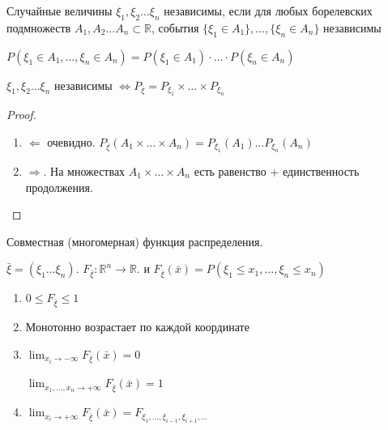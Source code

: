 \begin{definition}
    Случайные величины $\xi_1, \xi_2 \ldots \xi_n$ независимы, если для любых
    борелевских подмножеств $A_1, A_2 \ldots A_n \subset \mathbb{R}$, события
    $\{ \xi_1 \in A_1 \}, \ldots, \{ \xi_n \in A_n \}$ независимы

    \begin{remark}
        $P(\xi_1 \in A_1, \ldots, \xi_n \in A_n) = P(\xi_1 \in A_1) \cdot \ldots \cdot P(\xi_n \in A_n)$
    \end{remark}
\end{definition}

\begin{theorem}
    $\xi_1, \xi_2 \ldots \xi_n$ независимы $\Longleftrightarrow P_{\bar{\xi}} = P_{\xi_1} \times \ldots \times P_{\xi_n}$
\end{theorem}

\begin{proof}
    \begin{enumerate}
        \item $\Leftarrow$ очевидно. $P_{\bar{\xi}} (A_1 \times \ldots \times A_n) = P_{\xi_1} (A_1) \ldots P_{\xi_n}(A_n)$
        \item $\Rightarrow$. На множествах $A_1 \times \ldots \times A_n$ есть равенство + единственность продолжения.
    \end{enumerate}
\end{proof}

\begin{definition}
    Совместная (многомерная) функция распределения.

    $\bar{\xi} = (\xi_1 \ldots \xi_n)$. $F_{\bar{\xi}} : \mathbb{R}^n \to \mathbb{R}$. и
    $F_{\bar{\xi}} (\bar{x}) = P(\xi_1 \leqslant x_1,  \ldots, \xi_n \leqslant x_n) $
\end{definition}

\begin{properties}
    \begin{enumerate}
        \item {
            $0 \leqslant F_{\bar{\xi}} \leqslant 1$
        }
        \item {
            Монотонно возрастает по каждой координате
        }
        \item {
            $\lim_{x_i \to -\infty} F_{\bar{\xi}} (\bar{x}) = 0$

            $\lim_{x_1, \ldots, x_n \to +\infty} F_{\bar{\xi}} (\bar{x}) = 1$
        }
        \item {
            $\lim_{x_i \to +\infty} F_{\bar{\xi}} (\bar{x}) = F_{\xi_1, \ldots, \xi_{i - 1}, \xi_{i + 1}, \ldots}$
        }
    \end{enumerate}
\end{properties}

